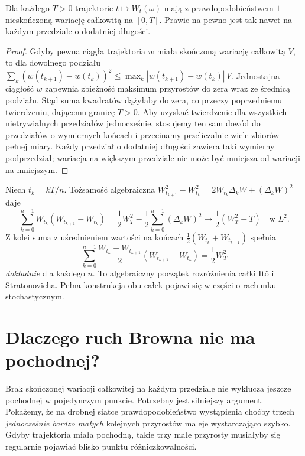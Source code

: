 \begin{wniosek}
Dla każdego $T>0$ trajektorie $t\mapsto W_t(\omega)$
mają z prawdopodobieństwem $1$ nieskończoną wariację
całkowitą na $[0,T]$. Prawie na pewno jest tak nawet
na każdym przedziale o dodatniej długości.
\end{wniosek}
\begin{proof}
Gdyby pewna ciągła trajektoria $w$ miała skończoną
wariację całkowitą $V$, to dla dowolnego podziału
$\sum_k(w(t_{k+1})-w(t_k))^2
\le\max_k|w(t_{k+1})-w(t_k)|\,V$.
Jednostajna ciągłość $w$ zapewnia zbieżność maksimum
przyrostów do zera wraz ze średnicą podziału.
Stąd suma kwadratów dążyłaby do zera, co przeczy
poprzedniemu twierdzeniu, dającemu granicę $T>0$.
Aby uzyskać twierdzenie dla wszystkich nietrywialnych
przedziałów jednocześnie, stosujemy ten sam dowód do
przedziałów o wymiernych końcach i przecinamy
przeliczalnie wiele zbiorów pełnej miary.
Każdy przedział o dodatniej długości zawiera taki
wymierny podprzedział; wariacja na większym przedziale
nie może być mniejsza od wariacji na mniejszym.
\end{proof}

\begin{przyklad}
Niech $t_k=kT/n$. Tożsamość algebraiczna
$W_{t_{k+1}}^2-W_{t_k}^2
=2W_{t_k}\Delta_kW+(\Delta_kW)^2$
daje
\[
\sum_{k=0}^{n-1}W_{t_k}(W_{t_{k+1}}-W_{t_k})
=\frac12W_T^2-\frac12\sum_{k=0}^{n-1}(\Delta_kW)^2
\longrightarrow \frac12(W_T^2-T)
\quad\text{w }L^2.
\]
Z kolei suma z uśrednieniem wartości na końcach
$\frac12(W_{t_k}+W_{t_{k+1}})$ spełnia
\[
\sum_{k=0}^{n-1}\frac{W_{t_k}+W_{t_{k+1}}}{2}
 (W_{t_{k+1}}-W_{t_k})=\frac12W_T^2
\]
\emph{dokładnie} dla każdego $n$.
To algebraiczny początek rozróżnienia całki Itô i
Stratonovicha. Pełna konstrukcja obu całek pojawi
się w części o rachunku stochastycznym.
\end{przyklad}

\section{Dlaczego ruch Browna nie ma pochodnej?}
Brak skończonej wariacji całkowitej na każdym przedziale nie
wyklucza jeszcze pochodnej w pojedynczym punkcie. Potrzebny
jest silniejszy argument. Pokażemy, że na drobnej siatce
prawdopodobieństwo wystąpienia choćby trzech \emph{jednocześnie
bardzo małych} kolejnych przyrostów maleje wystarczająco szybko.
Gdyby trajektoria miała pochodną, takie trzy małe przyrosty
musiałyby się regularnie pojawiać blisko punktu różniczkowalności.

